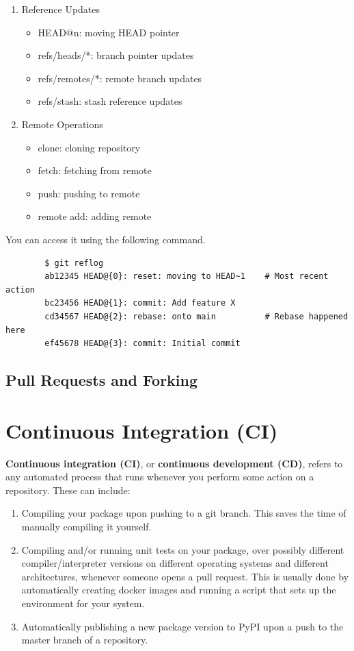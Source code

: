 \documentclass{article}
\begin{document}
\begin{definition}[Reflog]
\begin{enumerate}
        \item Reference Updates
          \begin{itemize}
            \item HEAD@{n}: moving HEAD pointer
            \item refs/heads/*: branch pointer updates
            \item refs/remotes/*: remote branch updates
            \item refs/stash: stash reference updates
          \end{itemize}

        \item Remote Operations
          \begin{itemize}
            \item clone: cloning repository
            \item fetch: fetching from remote
            \item push: pushing to remote
            \item remote add: adding remote
          \end{itemize}
      \end{enumerate}
      You can access it using the following command. 
      \begin{lstlisting}
        $ git reflog
        ab12345 HEAD@{0}: reset: moving to HEAD~1    # Most recent action
        bc23456 HEAD@{1}: commit: Add feature X 
        cd34567 HEAD@{2}: rebase: onto main          # Rebase happened here
        ef45678 HEAD@{3}: commit: Initial commit
      \end{lstlisting}
    \end{definition}

  \subsection{Pull Requests and Forking} 

\section{Continuous Integration (CI)} 

  \textbf{Continuous integration (CI)}, or \textbf{continuous development (CD)}, refers to any automated process that runs whenever you perform some action on a repository. These can include: 
  \begin{enumerate}
    \item Compiling your package upon pushing to a git branch. This saves the time of manually compiling it yourself. 
    \item Compiling and/or running unit tests on your package, over possibly different compiler/interpreter versions on different operating systems and different architectures, whenever someone opens a pull request. This is usually done by automatically creating docker images and running a script that sets up the environment for your system. 
    \item Automatically publishing a new package version to PyPI upon a push to the master branch of a repository. 
  \end{enumerate} 
\end{document}
